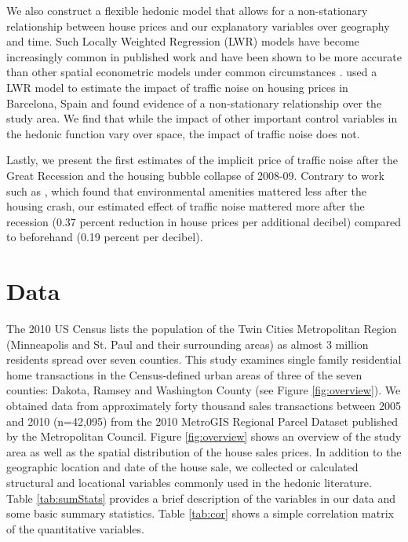\documentclass{article}\usepackage{graphicx, color}
\begin{document}
We also construct a flexible hedonic model that allows for a non-stationary relationship between house prices and our explanatory variables over geography and time. Such Locally Weighted Regression (LWR) models have become increasingly common in published work \citep[see][]{MarmolejoDuarteCarlos;GonzalezTamez2009, Carruthers2010, Sunding2010, Nappi-Choulet2011} and have been shown to be more accurate than other spatial econometric models under common circumstances \citep{McMillen2012}. \citet{MarmolejoDuarteCarlos;GonzalezTamez2009} used a LWR model to estimate the impact of traffic noise on housing prices in Barcelona, Spain and found evidence of a non-stationary relationship over the study area. We find that while the impact of other important control variables in the hedonic function vary over space, the impact of traffic noise does not. 

Lastly, we present the first estimates of the implicit price of traffic noise after the Great Recession and the housing bubble collapse of 2008-09. Contrary to work such as \citet{Cho2011b}, which found that environmental amenities mattered less after the housing crash, our estimated effect of traffic noise mattered more after the recession (0.37 percent reduction in house prices per additional decibel) compared to beforehand (0.19 percent per decibel).
 
\section{Data}
The 2010 US Census lists the population of the Twin Cities Metropolitan Region (Minneapolis and St. Paul and their surrounding areas)  as almost 3 million residents spread over seven counties. This study examines single family residential home transactions in the Census-defined urban areas of three of the seven counties: Dakota, Ramsey and Washington County (see Figure \ref{fig:overview}). We obtained data from approximately forty thousand sales transactions between 2005 and 2010 (n=42,095) from the 2010 MetroGIS Regional Parcel Dataset published by the Metropolitan Council. Figure \ref{fig:overview} shows an overview of the study area as well as the spatial distribution of the house sales prices. In addition to the geographic location and date of the house sale, we collected or calculated structural and locational variables commonly used in the hedonic literature. Table \ref{tab:sumStats} provides a brief description of the variables in our data and some basic summary statistics. Table \ref{tab:cor} shows a simple correlation matrix of the quantitative variables.
\end{document}
